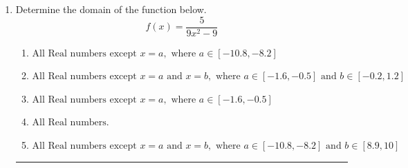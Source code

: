 \documentclass[14pt]{extbook}
\newcommand{\litem}[1]{\item#1\hspace*{-1cm}\rule{\textwidth}{0.4pt}}
\begin{document}
\begin{enumerate}
{\begin{enumerate}[label=\Alph*.]
\end{enumerate} }
\litem{
Determine the domain of the function below.\[ f(x) = \frac{5}{9x^{2} -9} \]\begin{enumerate}[label=\Alph*.]
\item \( \text{All Real numbers except } x = a, \text{ where } a \in [-10.8, -8.2] \)
\item \( \text{All Real numbers except } x = a \text{ and } x = b, \text{ where } a \in [-1.6, -0.5] \text{ and } b \in [-0.2, 1.2] \)
\item \( \text{All Real numbers except } x = a, \text{ where } a \in [-1.6, -0.5] \)
\item \( \text{All Real numbers.} \)
\item \( \text{All Real numbers except } x = a \text{ and } x = b, \text{ where } a \in [-10.8, -8.2] \text{ and } b \in [8.9, 10] \)


\end{enumerate}}
\end{enumerate}
\end{document}
